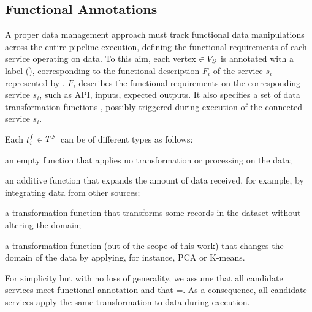     \subsection{Functional Annotations}\label{sec:funcannotation}
    A proper data management approach must track functional data manipulations across the entire pipeline execution, defining the functional requirements of each service operating on data.
    To this aim, each vertex $\in V_S$ is annotated with a label \myGamma(), corresponding to the functional description $F_i$ of the service $s_i$ represented by .
  $F_i$ describes the functional requirements on the corresponding service $s_i$, such as API, inputs, expected outputs.
    It also specifies a set \TF{} of data transformation functions , possibly triggered during execution of the connected service $s_i$.

    Each $t^f_{i}$$\in$$T^F_{}$ can be of different types as follows:
\begin{enumerate*}[label=\textit{\roman*})]
  \item an empty function \tf{\epsilon} that applies no transformation or processing on the data;
  \item an additive function  that expands the amount of data received, for example, by integrating data from other sources;
  \item a transformation function  that transforms some records in the dataset without altering the domain;
  \item a transformation function  (out of the scope of this work) that changes the domain of the data by applying, for instance, PCA or K-means.
\end{enumerate*}

For simplicity but with no loss of generality, we assume that all candidate services meet functional annotation \F{} and that \TF{}=\tf{}. As a consequence, all candidate services apply the same transformation to data during execution.

